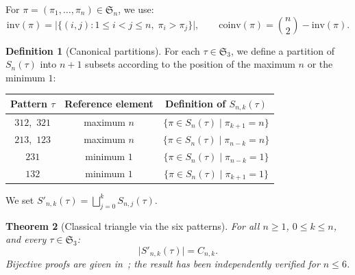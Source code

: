 \documentclass[12pt,a4paper,reqno]{amsart}
\theoremstyle{plain}
\newtheorem{theorem}{Theorem}[section]
\theoremstyle{definition}
\newtheorem{definition}[theorem]{Definition}
\newcommand{\Inv}{\mathrm{inv}}
\newcommand{\Coinv}{\mathrm{coinv}}
\newcommand{\Snkp}[1]{S'_{n,k}(#1)}
\begin{document}
For $\pi=(\pi_1,\ldots,\pi_n)\in\mathfrak{S}_n$, we use:
\[\Inv(\pi) = \bigl|\{(i,j):1\le i<j\le n,\;\pi_i>\pi_j\}\bigr|,
\qquad \Coinv(\pi) = \binom{n}{2}-\Inv(\pi).\]

\begin{definition}[Canonical partitions]\label{def:perm_part}
For each $\tau\in\mathfrak{S}_3$, we define a partition of $S_n(\tau)$
into $n+1$ subsets according to the position of the maximum $n$
or the minimum $1$:
\medskip
\begin{center}
\renewcommand{\arraystretch}{1.6}
\begin{tabular}{ccc}\toprule
\textbf{Pattern} $\tau$ & \textbf{Reference element}
  & \textbf{Definition of} $S_{n,k}(\tau)$\\\midrule
$312$,\ $321$ & maximum $n$ & $\{\pi\in S_n(\tau)\mid\pi_{k+1}=n\}$\\[4pt]
$213$,\ $123$ & maximum $n$ & $\{\pi\in S_n(\tau)\mid\pi_{n-k}=n\}$\\[4pt]
$231$ & minimum $1$ & $\{\pi\in S_n(\tau)\mid\pi_{n-k}=1\}$\\[4pt]
$132$ & minimum $1$ & $\{\pi\in S_n(\tau)\mid\pi_{k+1}=1\}$\\\bottomrule
\end{tabular}
\end{center}
\medskip
We set $\Snkp{\tau} = \bigsqcup_{j=0}^{k} S_{n,j}(\tau)$.
\end{definition}

\begin{theorem}[Classical triangle via the six patterns]\label{thm:class_perm}
For all $n\ge1$, $0\le k\le n$, and every $\tau\in\mathfrak{S}_3$:
\begin{equation}\label{eq:card_class}
\bigl|\Snkp{\tau}\bigr| = C_{n,k}.
\end{equation}
Bijective proofs are given in~\cite{W1};
the result has been independently verified for $n\le 6$.
\end{theorem}
\end{document}
